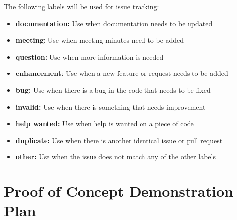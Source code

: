 \documentclass{article}
\begin{document}
The following labels will be used for issue tracking:
\begin{itemize}
    \item \textbf{documentation:} Use when documentation needs to be updated
    \item \textbf{meeting:} Use when meeting minutes need to be added
    \item \textbf{question:} Use when more information is needed
    \item \textbf{enhancement:} Use when a new feature or request needs to be added
    \item \textbf{bug:} Use when there is a bug in the code that needs to be fixed
    \item \textbf{invalid:} Use when there is something that needs improvement
    \item \textbf{help wanted:} Use when help is wanted on a piece of code
    \item \textbf{duplicate:} Use when there is another identical issue or pull request
    \item \textbf{other:} Use when the issue does not match any of the other labels
\end{itemize}

\section{Proof of Concept Demonstration Plan}
\end{document}

